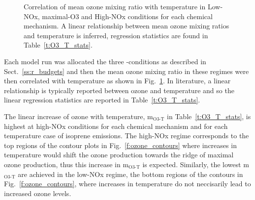 \begin{figure}%
    \centering%
    \caption{Correlation of mean ozone mixing ratio with temperature in Low-NOx, maximal-O3 and High-NOx conditions for each chemical mechanism. A linear relationship between mean ozone mixing ratios and temperature is inferred, regression statistics are found in Table~\ref{t:O3_T_stats}.}%
    \label{f:rate_O3_T}%
\end{figure}

\begin{table}%
    \centering%
    \caption{Regression statistics for the linear relationship between ozone mixing ratios and temperature shown in Figure~\ref{f:rate_O3_T}.}%
    \label{t:O3_T_stats}%
    
\end{table}

Each model run was allocated the three -conditions as described in Sect.~\ref{ss:r_budgets} and then the mean ozone mixing ratio in these  regimes were then correlated with temperature as shown in Fig.~\ref{f:rate_O3_T}.
In literature, a linear relationship is typically reported between ozone and temperature and so the linear regression statistics are reported in Table~\ref{t:O3_T_stats}.

The linear increase of ozone with temperature, m$_{\text{O3-T}}$ in Table~\ref{t:O3_T_stats}, is highest at high-NOx conditions for each chemical mechanism and for each temperature case of isoprene emissions.
The high-NOx regime corresponds to the top regions of the contour plots in Fig.~\ref{f:ozone_contours} where increases in temperature would shift the ozone production towards the ridge of maximal ozone production, thus this increase in m$_{\text{O3-T}}$ is expected.
Similarly, the lowest m$_{\text{O3-T}}$ are achieved in the low-NOx regime, the bottom regions of the contours in Fig.~\ref{f:ozone_contours}, where increases in temperature do not neccisarily lead to increased ozone levels.
